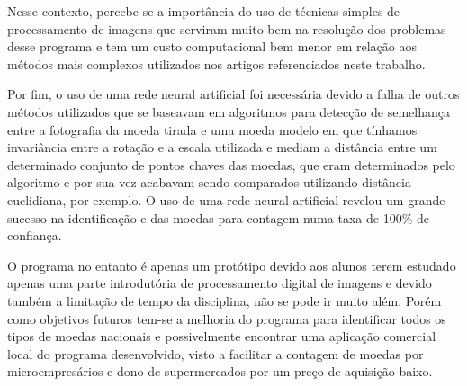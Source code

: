 \documentclass[10pt,journal,compsoc]{IEEEtran}
\begin{document}
Nesse contexto, percebe-se a importância do uso de técnicas simples de processamento de imagens que serviram muito bem na resolução dos problemas desse programa e tem um custo computacional bem menor em relação aos métodos mais complexos utilizados nos artigos referenciados neste trabalho.

Por fim, o uso de uma rede neural artificial foi necessária devido a falha de outros métodos utilizados que se baseavam em algoritmos para detecção de semelhança entre a fotografia da moeda tirada e uma moeda modelo em que tínhamos invariância entre a rotação e a escala utilizada e mediam a distância entre um determinado conjunto de pontos chaves das moedas, que eram determinados pelo algoritmo e por sua vez acabavam sendo comparados utilizando distância euclidiana, por exemplo. O uso de uma rede neural artificial revelou um grande sucesso na identificação e das moedas para contagem numa taxa de 100$\%$ de confiança.

O programa no entanto é apenas um protótipo devido aos alunos terem estudado apenas uma parte introdutória de processamento digital de imagens e devido também a limitação de tempo da disciplina, não se pode ir muito além. Porém como objetivos futuros tem-se a melhoria do programa para identificar todos os tipos de moedas nacionais e possivelmente encontrar uma aplicação comercial local do programa desenvolvido, visto a facilitar a contagem de moedas por microempresários e dono de supermercados por um preço de aquisição baixo.  

\medskip



\end{document}
